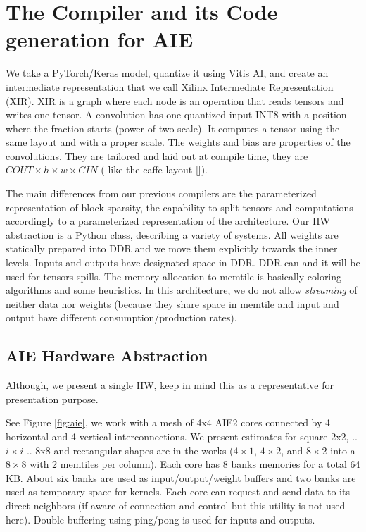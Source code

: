 \documentclass{IEEEtran}
\begin{document}


\section{The Compiler and its Code generation for AIE}
\label{sec:compiler}
We take a PyTorch/Keras model, quantize it using Vitis AI, and create
an intermediate representation that we call Xilinx Intermediate
Representation (XIR). XIR is a graph where each node is an operation
that reads tensors and writes one tensor.  A convolution has one
quantized input INT8 with a position where the fraction starts (power
of two scale). It computes a tensor using the same layout and with a
proper scale.  The weights and bias are properties of the
convolutions. They are tailored and laid out at compile time, they are
$COUT\times h \times w \times CIN$ ( like the caffe layout
\cite{Caffe} []).


The main differences from our previous compilers are the parameterized
representation of block sparsity, the capability to split tensors and
computations accordingly to a parameterized representation of the
architecture. Our HW abstraction is a Python class, describing a
variety of systems. All weights are statically prepared into DDR and
we move them explicitly towards the inner levels. Inputs and outputs
have designated space in DDR. DDR can and it will be used for tensors
spills.  The memory allocation to memtile is basically coloring
algorithms and some heuristics. In this architecture, we do not allow
{\em streaming} of neither data nor weights (because they share space
in memtile and input and output have different consumption/production
rates). 

\subsection{AIE Hardware Abstraction}
Although, we present a single HW, keep in mind this as a
representative for presentation purpose.


See Figure \ref{fig:aie}, we work with a mesh of 4x4 AIE2 cores
connected by 4 horizontal and 4 vertical interconnections.  We present
estimates for square 2x2, .. $i\times i$ .. 8x8 and rectangular shapes
are in the works ($4\times 1$, $4 \times 2$, and $8\times 2$ into a $8
\times 8$ with 2 memtiles per column). Each core has 8 banks memories
for a total 64 KB. About six banks are used as input/output/weight
buffers and two banks are used as temporary space for kernels. Each
core can request and send data to its direct neighbors (if aware of
connection and control but this utility is not used here). Double
buffering using ping/pong is used for inputs and outputs.
\end{document}

